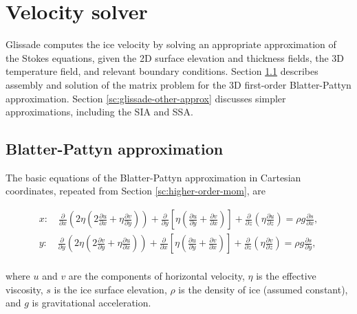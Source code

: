 
\section{Velocity solver}
\label{sc:glissade-velocity}

Glissade computes the ice velocity by solving an appropriate
approximation of the Stokes equations, given the 2D surface elevation and thickness fields,
the 3D temperature field, and relevant boundary conditions.
Section \ref{sc:glissade-blatter-pattyn} describes assembly and solution of the matrix problem for the 
3D first-order Blatter-Pattyn approximation.  
Section \ref{sc:glissade-other-approx} discusses simpler approximations, including the SIA and SSA.

\subsection{Blatter-Pattyn approximation}
\label{sc:glissade-blatter-pattyn}

The basic equations of the Blatter-Pattyn approximation in Cartesian coordinates, repeated from 
Section \ref{sc:higher-order-mom}, are 

\begin{equation}
  \label{gliss.eq.stress_balance}
  \begin{split}
    x: \quad \frac{\partial }{\partial x}\left( 2 \eta \left(2\frac{\partial u}{\partial x} +  \eta \frac{\partial v}{\partial y} \right) \right) 
    + \frac{\partial }{\partial y}\left[ \eta \left( \frac{\partial u}{\partial y} + \frac{\partial v}{\partial x} \right) \right] 
    +\frac{\partial }{\partial z}\left( \eta \frac{\partial u}{\partial z} \right) = \rho g\frac{\partial s}{\partial x}, \\
    y: \quad \frac{\partial }{\partial y}\left( 2 \eta \left( 2\frac{\partial v}{\partial y} + \eta \frac{\partial u}{\partial x} \right) \right) 
    + \frac{\partial }{\partial x}\left[ \eta \left( \frac{\partial u}{\partial y} + \frac{\partial v}{\partial x} \right) \right] 
    +\frac{\partial }{\partial z}\left( \eta \frac{\partial v}{\partial z} \right) = \rho g\frac{\partial s}{\partial y},  \\
  \end{split}
\end{equation}

\noindent
where $u$ and $v$ are the components of horizontal velocity, $\eta$ is the effective viscosity, $s$ is the ice surface elevation,
$\rho$ is the density of ice (assumed constant), and $g$ is gravitational acceleration.  

